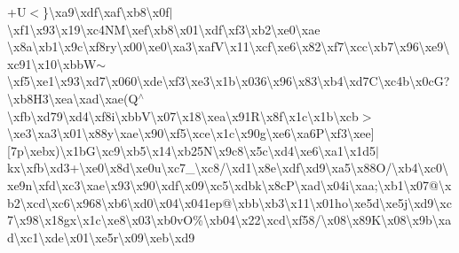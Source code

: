 \begin{DoxyCompactItemize}
+U$<$\}\textbackslash{}xa9\textbackslash{}xdf\textbackslash{}xaf\textbackslash{}xb8\textbackslash{}x0f$\vert$\textbackslash{}xf1\textbackslash{}x93\textbackslash{}x19\textbackslash{}xc4\+N\+M\textbackslash{}xef\textbackslash{}xb8\textbackslash{}x01\textbackslash{}xdf\textbackslash{}xf3\textbackslash{}xb2\textbackslash{}xe0\textbackslash{}xae \textbackslash{}x8a\textbackslash{}xb1\textbackslash{}x9c\textbackslash{}xf8ry\textbackslash{}x00\textbackslash{}xe0\textbackslash{}xa3\textbackslash{}xaf\+V\textbackslash{}x11\textbackslash{}xcf\textbackslash{}xe6\textbackslash{}x82\textbackslash{}xf7\textbackslash{}xcc\textbackslash{}xb7\textbackslash{}x96\textbackslash{}xe9\textbackslash{}xc91\textbackslash{}x10\textbackslash{}xbb\+W$\sim$\textbackslash{}xf5\textbackslash{}xe1\textbackslash{}x93\textbackslash{}xd7\textbackslash{}x060\textbackslash{}xde\textbackslash{}xf3\textbackslash{}xe3\textbackslash{}x1b\textbackslash{}x036\textbackslash{}x96\textbackslash{}x83\textbackslash{}xb4\textbackslash{}xd7\+C\textbackslash{}xc4b\textbackslash{}x0c\+G?\textbackslash{}xb8\+H3\textbackslash{}xea\textbackslash{}xad\textbackslash{}xae(\+Q$^\wedge$\textbackslash{}xfb\textbackslash{}xd79\textbackslash{}xd4\textbackslash{}xf8i\textbackslash{}xbb\+V\textbackslash{}x07\textbackslash{}x18\textbackslash{}xea\textbackslash{}x91\+R\textbackslash{}x8f\textbackslash{}x1c\textbackslash{}x1b\textbackslash{}xcb$>$\textbackslash{}xe3\textbackslash{}xa3\textbackslash{}x01\textbackslash{}x88y\textbackslash{}xae\textbackslash{}x90\textbackslash{}xf5\textbackslash{}xce\textbackslash{}x1c\textbackslash{}x90g\textbackslash{}xe6\textbackslash{}xa6\+P\textbackslash{}xf3\textbackslash{}xee\mbox{]}\mbox{[}7p\textbackslash{}xebx)\textbackslash{}x1b\+G\textbackslash{}xc9\textbackslash{}xb5\textbackslash{}x14\textbackslash{}xb25\+N\textbackslash{}x9c8\textbackslash{}x5c\textbackslash{}xd4\textbackslash{}xe6\textbackslash{}xa1\textbackslash{}x1d5$\vert$kx\textbackslash{}xfb\textbackslash{}xd3+\textbackslash{}xe0\textbackslash{}x8d\textbackslash{}xe0u\textbackslash{}xc7\+\_\+\textbackslash{}xc8/\textbackslash{}xd1\textbackslash{}x8e\textbackslash{}xdf\textbackslash{}xd9\textbackslash{}xa5\textbackslash{}x88\+O/\textbackslash{}xb4\textbackslash{}xc0\textbackslash{}xe9n\textbackslash{}xfd\textbackslash{}xc3\textbackslash{}xae\textbackslash{}x93\textbackslash{}x90\textbackslash{}xdf\textbackslash{}x09\textbackslash{}xc5\textbackslash{}xdbk\textbackslash{}x8c\+P\textbackslash{}xad\textbackslash{}x04i\textbackslash{}xaa;\textbackslash{}xb1\textbackslash{}x07@\textbackslash{}xb2\textbackslash{}xcd\textbackslash{}xc6\textbackslash{}x968\textbackslash{}xb6\textbackslash{}xd0\textbackslash{}x04\textbackslash{}x041ep@\textbackslash{}xbb\textbackslash{}xb3\textbackslash{}x11\textbackslash{}x01ho\textbackslash{}xe5d\textbackslash{}xe5j\textbackslash{}xd9\textbackslash{}xc7\textbackslash{}x98\textbackslash{}x18gx\textbackslash{}x1c\textbackslash{}xe8\textbackslash{}x03\textbackslash{}xb0v\+O\%\textbackslash{}xb04\textbackslash{}x22\textbackslash{}xcd\textbackslash{}xf58/\textbackslash{}x08\textbackslash{}x89\+K\textbackslash{}x08\textbackslash{}x9b\textbackslash{}xad\textbackslash{}xc1\textbackslash{}xde\textbackslash{}x01\textbackslash{}xe5r\textbackslash{}x09\textbackslash{}xeb\textbackslash{}xd9\textbacksla
\end{DoxyCompactItemize}
